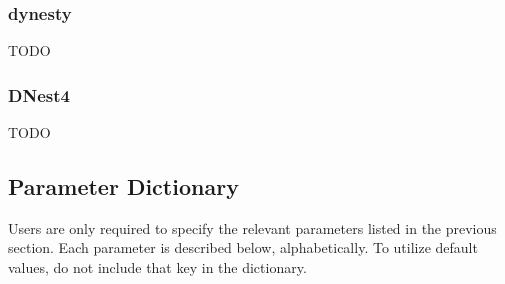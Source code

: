 \documentclass[letterpaper, 12pt]{article}
\begin{document}
\subsubsection{dynesty}
TODO

\subsubsection{DNest4}
TODO

\subsection{Parameter Dictionary}

Users are only required to specify the relevant parameters listed in 
the previous section.  Each parameter is described below, alphabetically.
To utilize default values, do not include that key in the dictionary.
\end{document}
